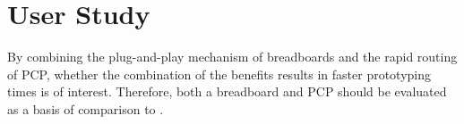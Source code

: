 \section{User Study}

By combining the plug-and-play mechanism of breadboards and the rapid routing of PCP, whether the combination of the benefits results in faster prototyping times is of interest. Therefore, both a breadboard and PCP should be evaluated as a basis of comparison to \papertitle.






